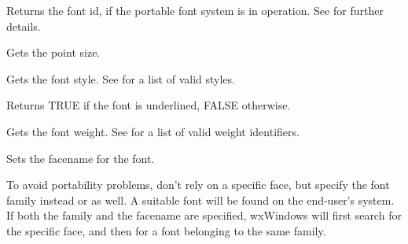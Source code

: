 
Returns the font id, if the portable font system is in operation. See  for
further details.

\label{wxfontgetpointsize}


Gets the point size.



\label{wxfontgetstyle}


Gets the font style. See  for a list of valid
styles.



\label{wxfontgetunderlined}


Returns TRUE if the font is underlined, FALSE otherwise.



\label{wxfontgetweight}


Gets the font weight. See  for a list of valid
weight identifiers.



\label{wxfontsetfacename}


Sets the facename for the font.




To avoid portability problems, don't rely on a specific face, but specify the font family
instead or as well. A suitable font will be found on the end-user's system. If both the
family and the facename are specified, wxWindows will first search for the specific face,
and then for a font belonging to the same family.

